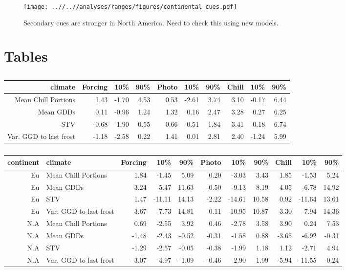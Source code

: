 \documentclass[12pt]{article}\usepackage[]{graphicx}\usepackage[]{color}
\begin{document}
\begin{figure}[h!]
    \centering
 \texttt{[image: ..//..//analyses/ranges/figures/continental\_cues.pdf]} 
    \caption{Secondary cues are stronger in North America. Need to check this using new models. }
    \label{fig:cuediff}
\end{figure}

\pagebreak
\iffalse 

\section*{Tables}
\begin{table}
\centering
\begin{tabular}{|r|rrr|rrr|rrr|}
  \hline
  climate & Forcing & 10\% & 90\% & Photo & 10\% & 90\% & Chill & 10\% & 90\% \\ 
  \hline
 Mean Chill Portions & 1.43 & -1.70 & 4.53 & 0.53 & -2.61 & 3.74 & 3.10 & -0.17 & 6.44 \\ 
  Mean GDDs & 0.11 & -0.96 & 1.24 & 1.32 & 0.16 & 2.47 & 3.28 & 0.27 & 6.25 \\ 
   STV & -0.68 & -1.90 & 0.55 & 0.66 & -0.51 & 1.84 & 3.41 & 0.18 & 6.74 \\ 
   Var. GGD to last frost & -1.18 & -2.58 & 0.22 & 1.41 & 0.01 & 2.81 & 2.40 & -1.24 & 5.99 \\ 
   \hline
\end{tabular}
\label{tab:outfull}
\caption{}
\end{table}

\begin{table}
\centering
\begin{tabular}{|r|p{3 cm}|rrr|rrr|rrr|}
  \hline
  \hline
 continent & climate & Forcing & 10\% & 90\% & Photo & 10\% & 90\% & Chill & 10\% & 90\% \\ 
  \hline
 Eu & Mean Chill Portions & 1.84 & -1.45 & 5.09 & 0.20 & -3.03 & 3.43 & 1.85 & -1.53 & 5.24 \\ 
 \hline
    Eu & Mean GDDs & 3.24 & -5.47 & 11.63 & -0.50 & -9.13 & 8.19 & 4.05 & -6.78 & 14.92 \\ 
    \hline
    Eu & STV & 1.47 & -11.11 & 14.13 & -2.22 & -14.61 & 10.58 & 0.92 & -11.64 & 13.61 \\ 
    \hline
    Eu & Var. GGD to last frost & 3.67 & -7.73 & 14.81 & 0.11 & -10.95 & 10.87 & 3.30 & -7.94 & 14.36 \\ 
    \hline
    \hline
    N.A & Mean Chill Portions & 0.69 & -2.55 & 3.92 & 0.46 & -2.78 & 3.58 & 3.90 & 0.24 & 7.53 \\ 
    \hline
    N.A & Mean GDDs & -1.48 & -2.43 & -0.52 & -0.31 & -1.58 & 0.88 & -3.65 & -6.92 & -0.31 \\ 
    \hline
    N.A & STV & -1.29 & -2.57 & -0.05 & -0.38 & -1.99 & 1.18 & 1.12 & -2.71 & 4.94 \\ 
    \hline
    N.A & Var. GGD to last frost & -3.07 & -4.97 & -1.09 & -0.46 & -2.90 & 1.99 & -5.94 & -11.55 & -0.24 \\ 
  \hline
   \hline
\end{tabular}
\label{tab:outcont}
\caption{}
\end{table}
\end{document}
